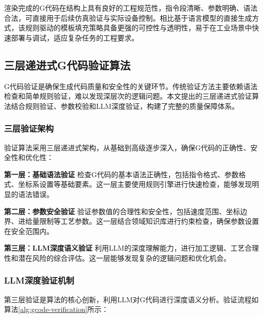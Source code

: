 \documentclass[preprint,12pt]{elsarticle}
\begin{document}
渲染完成的G代码在结构上具有良好的工程规范性，指令段清晰、参数明确、语法合法，可直接用于后续仿真验证与实际设备控制。相比基于语言模型的直接生成方式，该规则驱动的模板填充策略具备更强的可控性与透明性，易于在工业场景中快速部署与调试，适应复杂任务的工程要求。

\subsection{三层递进式G代码验证算法}

G代码验证是确保生成代码质量和安全性的关键环节。传统验证方法主要依赖语法检查和简单规则验证，难以发现深层次的逻辑问题。本文提出的三层递进式验证算法结合规则验证、参数校验和LLM深度验证，构建了完整的质量保障体系。

\subsubsection{三层验证架构}

验证算法采用三层递进式架构，从基础到高级逐步深入，确保G代码的正确性、安全性和优化性：

\textbf{第一层：基础语法验证}
检查G代码的基本语法正确性，包括指令格式、参数格式、坐标系设置等基础要素。这一层主要使用规则引擎进行快速检查，能够发现明显的语法错误。

\textbf{第二层：参数安全验证}
验证参数值的合理性和安全性，包括速度范围、坐标边界、进给量限制等工艺参数。这一层结合领域知识库进行约束检查，确保参数设置在安全范围内。

\textbf{第三层：LLM深度语义验证}
利用LLM的深度理解能力，进行加工逻辑、工艺合理性和潜在风险的综合评估。这一层能够发现复杂的逻辑问题和优化机会。

\subsubsection{LLM深度验证机制}

第三层验证是算法的核心创新，利用LLM对G代码进行深度语义分析。验证流程如算法\ref{alg:gcode-verification}所示：
\end{document}

